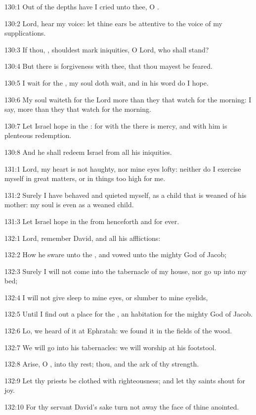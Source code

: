 130:1 Out of the depths have I cried unto thee, O \LORD.

130:2 Lord, hear my voice: let thine ears be attentive to the voice of
my supplications.

130:3 If thou, \LORD, shouldest mark iniquities, O Lord, who shall
stand?

130:4 But there is forgiveness with thee, that thou mayest be feared.

130:5 I wait for the \LORD, my soul doth wait, and in his word do I
hope.

130:6 My soul waiteth for the Lord more than they that watch for the
morning: I say, more than they that watch for the morning.

130:7 Let Israel hope in the \LORD: for with the \LORD there is mercy,
and with him is plenteous redemption.

130:8 And he shall redeem Israel from all his iniquities.



131:1 Lord, my heart is not haughty, nor mine eyes lofty: neither do I
exercise myself in great matters, or in things too high for me.

131:2 Surely I have behaved and quieted myself, as a child that is
weaned of his mother: my soul is even as a weaned child.

131:3 Let Israel hope in the \LORD from henceforth and for ever.



132:1 Lord, remember David, and all his afflictions:

132:2 How he sware unto the \LORD, and vowed unto the mighty God of
Jacob;

132:3 Surely I will not come into the tabernacle of my house, nor go
up into my bed;

132:4 I will not give sleep to mine eyes, or slumber to mine eyelids,

132:5 Until I find out a place for the \LORD, an habitation for the
mighty God of Jacob.

132:6 Lo, we heard of it at Ephratah: we found it in the fields of the
wood.

132:7 We will go into his tabernacles: we will worship at his
footstool.

132:8 Arise, O \LORD, into thy rest; thou, and the ark of thy strength.

132:9 Let thy priests be clothed with righteousness; and let thy
saints shout for joy.

132:10 For thy servant David's sake turn not away the face of thine
anointed.

